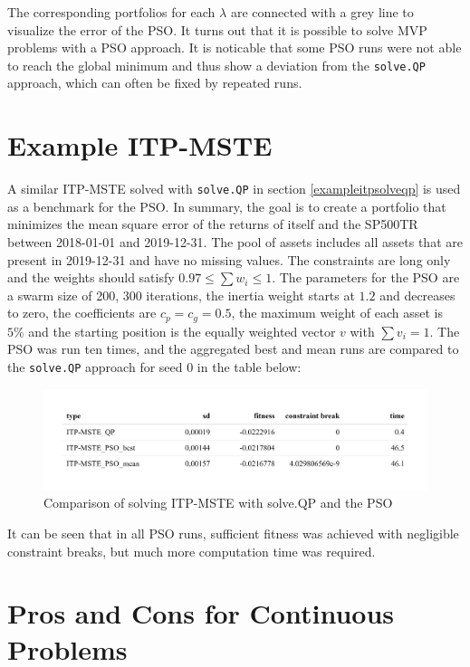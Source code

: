 \documentclass[
  oneside, a4paper, 12pt, openany]{book}
\theoremstyle{definition}
\theoremstyle{definition}
\theoremstyle{definition}
\theoremstyle{definition}
\theoremstyle{remark}
\begin{document}
The corresponding portfolios for each \(\lambda\) are connected with a grey line to visualize the error of the PSO. It turns out that it is possible to solve MVP problems with a PSO approach. It is noticable that some PSO runs were not able to reach the global minimum and thus show a deviation from the \texttt{solve.QP} approach, which can often be fixed by repeated runs.

\hypertarget{example-itp-mste}{%
\section{Example ITP-MSTE}\label{example-itp-mste}}

A similar ITP-MSTE solved with \texttt{solve.QP} in section \ref{exampleitpsolveqp} is used as a benchmark for the PSO. In summary, the goal is to create a portfolio that minimizes the mean square error of the returns of itself and the SP500TR between 2018-01-01 and 2019-12-31. The pool of assets includes all assets that are present in 2019-12-31 and have no missing values. The constraints are long only and the weights should satisfy \(0.97 \leq \textstyle\sum w_i \leq 1\). The parameters for the PSO are a swarm size of 200, 300 iterations, the inertia weight starts at \(1.2\) and decreases to zero, the coefficients are \(c_p=c_g=0.5\), the maximum weight of each asset is \(5\%\) and the starting position is the equally weighted vector \(v\) with \(\textstyle\sum v_i=1\). The PSO was run ten times, and the aggregated best and mean runs are compared to the \texttt{solve.QP} approach for seed 0 in the table below:

\begin{figure}[H]
\includegraphics{Master_Thesis_files/figure-latex/pso8-1} \caption{Comparison of solving ITP-MSTE with solve.QP and the PSO}\label{fig:pso8}
\end{figure}

It can be seen that in all PSO runs, sufficient fitness was achieved with negligible constraint breaks, but much more computation time was required.

\hypertarget{pros-and-cons-for-continuous-problems}{%
\section{Pros and Cons for Continuous Problems}\label{pros-and-cons-for-continuous-problems}}
\end{document}
